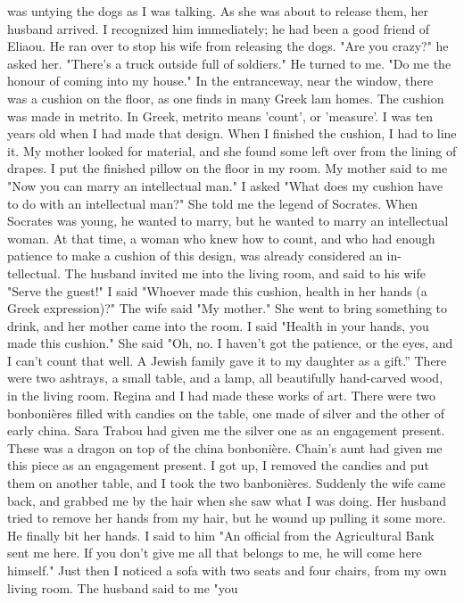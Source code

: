 was untying the dogs as I was talking. As she was about to release them, her husband
arrived. I recognized him immediately; he had been a good friend of Eliaou. He ran over 
to stop his wife from releasing the dogs. 
"Are you crazy?" he asked her. "There's a truck outside full of soldiers." He 
turned to me. "Do me the honour of coming into my house." In the entranceway, near 
the window, there was a cushion on the floor, as one finds in many Greek lam homes. The 
cushion was made in metrito. In Greek, metrito means 'count', or 'measure'. I was ten 
years old when I had made that design. When I finished the cushion, I had to line it. My 
mother looked for material, and she found some left over from the lining of drapes. I 
put the finished pillow on the floor in my room. My mother said to me "Now you can marry 
an intellectual man." I asked "What does my cushion have to do with an intellectual man?" 
She told me the legend of Socrates. When Socrates was young, he wanted to marry, but he 
wanted to marry an intellectual woman. At that time, a woman who knew how to count, and 
who had enough patience to make a cushion of this design, was already considered an in-
tellectual. 
The husband invited me into the living room, and said to his wife "Serve the guest!" 
I said "Whoever made this cushion, health in her hands (a Greek expression)?" The wife 
said "My mother." She went to bring something to drink, and her mother came into the 
room. I said "Health in your hands, you made this cushion." She said "Oh, no. I haven't 
got the patience, or the eyes, and I can't count that well. A Jewish family gave it to 
my daughter as a gift.”
There were two ashtrays, a small table, and a lamp, all beautifully hand-carved wood, 
in the living room. Regina and I had made these works of art. There were two bonbonières filled with candies on the table, one made of silver and the other of early china. 
Sara Trabou had given me the silver one as an engagement present. These was a dragon on 
top of the china bonbonière. Chain's aunt had given me this piece as an engagement present. I got up, I removed the candies and put them on another table, and I took the two 
banbonières. Suddenly the wife came back, and grabbed me by the hair when she saw what 
I was doing. Her husband tried to remove her hands from my hair, but he wound up pulling it some more. He finally bit her hands. I said to him "An official from the Agricultural Bank sent me here. If you don't give me all that belongs to me, he will come here himself." Just then I noticed a sofa with two seats and four chairs, from my own living room. The husband said to me "you 
